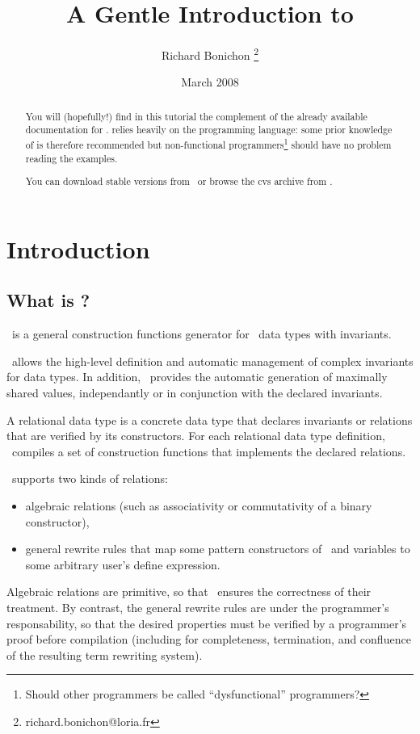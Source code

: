 \documentclass{article}
\title{A Gentle Introduction to \moca}
\author{Richard Bonichon \footnote{{\sf richard.bonichon@loria.fr}}}
\date{March 2008}
\begin{document}
  \begin{abstract}
   You will (hopefully!) find in this tutorial the complement of the
already available documentation for \moca. \moca relies heavily on the
\ocaml programming language: some prior knowledge of \ocaml is
therefore recommended but non-\ocaml functional
programmers\footnote{Should other programmers be called
  ``dysfunctional'' programmers?} should have no problem reading the examples. 

You can download stable versions from \mocaweb\ or browse the cvs
archive from \mocacvs.

\end{abstract}
\maketitle
\tableofcontents



\section{Introduction}
\label{sec:intro}

\subsection{What is \moca ?}
\moca\ is a general construction functions generator for \ocaml\ data types
with invariants.

\moca\ allows the high-level definition and automatic management of
complex invariants for data types. In addition, \moca\ provides the
automatic generation of maximally shared values, independantly or in
conjunction with the declared invariants.

A relational data type is a concrete data type that declares
invariants or relations that are verified by its constructors. For
each relational data type definition, \moca\ compiles a set of
construction functions that implements the declared relations.

\moca\ supports two kinds of relations:
\begin{itemize}
\item algebraic relations (such as associativity or commutativity of a
binary constructor), 
\item general rewrite rules that map some pattern constructors
of \moca\ and variables to some arbitrary user's define expression.
\end{itemize}

Algebraic relations are primitive, so that \moca\ ensures the
correctness of their treatment. By contrast, the general rewrite rules
are under the programmer's responsability, so that the desired
properties must be verified by a programmer's proof before compilation
(including for completeness, termination, and confluence of the
resulting term rewriting system).
\end{document}
